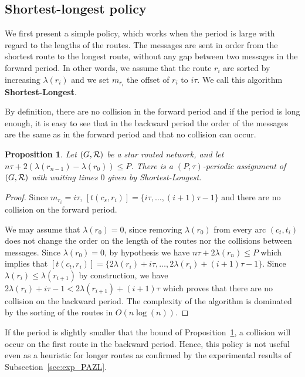 \documentclass[10pt, conference, letterpaper]{IEEEtran}
\newtheorem{proposition}{Proposition}
\begin{document}
\subsection{Shortest-longest policy}
    

    We first present a simple policy, which works when the period is large with regard to the lengths of the routes.
    The messages are sent in order from the shortest route to the longest route, without any gap between two messages in the forward period.
    In other words, we assume that the route $r_i$ are sorted by increasing $\lambda(r_i)$ and we set $m_{r_i}$ the offset of $r_i$ to $i\tau$. We call this algorithm {\bf Shortest-Longest}.
      
     By definition, there are no collision in the forward period and if the period is long enough, 
     it is easy to see that in the backward period the order of the messages are the same as in the forward period and that no collision can occur. 
      
      
      \begin{proposition} Let $(G, {\cal R})$ be a star routed network, and let $n\tau + 2(\lambda(r_{n-1}) - \lambda(r_{0})) \leq P$. There is a $(P,\tau)$-periodic assignment of $(G, {\cal R})$ with waiting times $0$ given by Shortest-Longest.\label{prop:SL}
      \end{proposition}
      \begin{proof}
       Since $m_{r_i} = i\tau$, $[t(c_s,r_{i})] = \{i\tau,\dots, (i+1)\tau -1\}$ and there are no collision on the forward period.
       
       
       We may assume that $\lambda(r_{0}) = 0$, since removing $\lambda(r_{0})$ from every arc $(c_t,t_i)$ does not change the order on the length of the routes nor the collisions between messages.
       Since $\lambda(r_{0}) = 0$, by hypothesis we have $n\tau + 2\lambda(r_{n}) \leq P$ which implies that
       $[t(c_t,r_{i})] = \{2 \lambda(r_{i}) + i\tau, \dots,  2 \lambda(r_{i}) + (i+1)\tau -1\}$.
       Since $ \lambda(r_{i}) \leq  \lambda(r_{i+1})$ by construction, we have  $2 \lambda(r_{i}) + i\tau -1 < 2 \lambda(r_{i+1}) + (i+1)\tau$ which proves that there are no collision on the backward period. 
 The complexity of the algorithm is dominated by the sorting of the routes in $O(n\log(n))$. 
      \end{proof}

      If the period is slightly smaller that the bound of Proposition~\ref{prop:SL}, a collision will occur on the first route in the backward period. Hence, this policy is not useful even as a heuristic for longer routes as confirmed by the experimental results of Subsection~\ref{sec:exp_PAZL}. 
\end{document}
